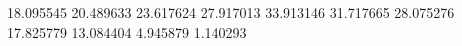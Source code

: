 18.095545
20.489633
23.617624
27.917013
33.913146
31.717665
28.075276
17.825779
13.084404
4.945879
1.140293
